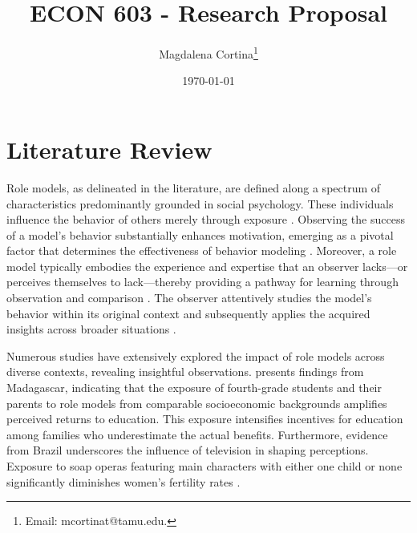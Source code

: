




\title{\Large \textbf{ECON 603 - Research Proposal}}

\author{Magdalena Cortina\thanks{Email: mcortinat@tamu.edu.}} 
\date{\today}

\maketitle
\thispagestyle{empty} 
\doublespacing
\thispagestyle{empty} 

\vspace{-10mm}

\doublespacing

\section*{Literature Review}

Role models, as delineated in the literature, are defined along a spectrum of characteristics predominantly grounded in social psychology. These individuals influence the behavior of others merely through exposure \citep{merton_social_1968}. Observing the success of a model’s behavior substantially enhances motivation, emerging as a pivotal factor that determines the effectiveness of behavior modeling \citep{bandura_social_1977}. Moreover, a role model typically embodies the experience and expertise that an observer lacks—or perceives themselves to lack—thereby providing a pathway for learning through observation and comparison \citep{kemper_reference_1968}. The observer attentively studies the model’s behavior within its original context and subsequently applies the acquired insights across broader situations \citep{brophy_child_1977}.

Numerous studies have extensively explored the impact of role models across diverse contexts, revealing insightful observations. \citet{nguyen_information_nodate} presents findings from Madagascar, indicating that the exposure of fourth-grade students and their parents to role models from comparable socioeconomic backgrounds amplifies perceived returns to education. This exposure intensifies incentives for education among families who underestimate the actual benefits. Furthermore, evidence from Brazil underscores the influence of television in shaping perceptions. Exposure to soap operas featuring main characters with either one child or none significantly diminishes women’s fertility rates \citep{la_ferrara_soap_2012}.

